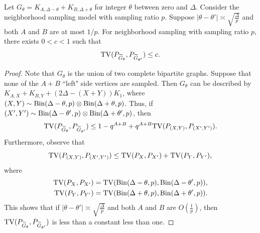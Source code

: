 \begin{lemma} \label{lmm:lower-star}
Let $ G_{\theta} = K_{A, \Delta-\theta} + K_{B, \Delta+\theta} $ for integer $ \theta $ between zero and $ \Delta $. 
Consider the neighborhood sampling model with sampling ratio $p$. Suppose $ |\theta - \theta'| \asymp \sqrt{\frac{\Delta}{p}} $ and both $ A $ and $ B $ are at most $ 1/p $. For neighborhood sampling with sampling ratio $ p $, there exists $ 0 < c < 1 $ such that
\begin{equation*}
{\rm TV}(P_{{\widetilde{G}}_{\theta}}, P_{{\widetilde{G}}_{\theta'}}) \leq  c.
\end{equation*}
\end{lemma}
\begin{proof}
Note that $ G_{\theta} $ is the union of two complete bipartite graphs. Suppose that none of the $ A + B $ ``left" side vertices are sampled. Then $ G_{\theta} $ can be described by $ K_{A, X} + K_{B, Y} + (2\Delta-(X+Y))K_1 $, where $ (X, Y) \sim \mathrm{Bin}(\Delta-\theta, p) \otimes \mathrm{Bin}(\Delta+\theta, p) $. Thus, if $ (X', Y') \sim \mathrm{Bin}(\Delta-\theta', p) \otimes \mathrm{Bin}(\Delta+\theta', p) $, then
\begin{equation*}
{\rm TV}(P_{{\widetilde{G}}_{\theta}}, P_{{\widetilde{G}}_{\theta'}}) \leq 1-q^{A+B} + q^{A+B}{\rm TV}(P_{(X, Y)}, P_{(X', Y')}).
\end{equation*}
Furthermore, observe that
\begin{equation*}
{\rm TV}(P_{(X, Y)}, P_{(X', Y')}) \leq {\rm TV}(P_X, P_{X'}) + {\rm TV}(P_Y, P_{Y'}),
\end{equation*}
where 
\begin{align*}
{\rm TV}(P_X, P_{X'}) & = {\rm TV}(\mathrm{Bin}(\Delta-\theta, p), \mathrm{Bin}(\Delta-\theta', p)), \\
{\rm TV}(P_Y, P_{Y'}) & = {\rm TV}(\mathrm{Bin}(\Delta+\theta, p), \mathrm{Bin}(\Delta+\theta', p)).
\end{align*}
This shows that if $ |\theta - \theta'| \asymp \sqrt{\frac{\Delta}{p}} $ and both $ A $ and $ B $ are $O(\frac{1}{p}) $, then $ {\rm TV}(P_{{\widetilde{G}}_{\theta}}, P_{{\widetilde{G}}_{\theta'}}) $ is less than a constant less than one.
\end{proof}

